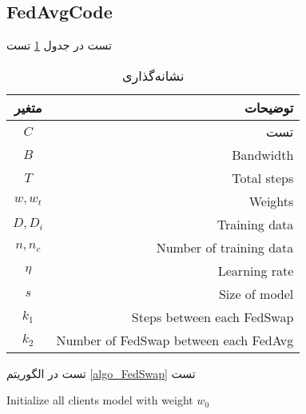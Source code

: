 \subsection{FedAvgCode}
تست در جدول
\ref{tabel_notation}
تست

\begin{table}[h]
	\centering
	\caption{نشانه‌گذاری}
	\label{tabel_notation}
	\begin{tabular}{cr}
		\hline
		متغیر & توضیحات \\
		\hline
		$C$ & تست \\
		$B$ & Bandwidth \\
		$T$ & Total steps \\
		$w, w_t$ & Weights \\
		$D, D_i$ & Training data \\
		$n, n_c$ & Number of training data \\
		$\eta$ & Learning rate \\
		$s$ & Size of model \\
		$k_1$ & Steps between each FedSwap \\
		$k_2$ & Number of FedSwap between each FedAvg \\
		\hline
	\end{tabular}
\end{table}




تست در الگوریتم
\ref{algo_FedSwap}
تست


\begin{LTR}
\begin{algorithm}[t]
	\begin{RTL}
	\caption{%
		تعویض فدرال
		\cite{chiu2020semisupervised}
	}
	\label{algo_FedSwap}
	\end{RTL}
	
	\begin{latin}
	Initialize all clients model with weight $w_0$\;
	\end{latin}
\end{algorithm}
\end{LTR}



